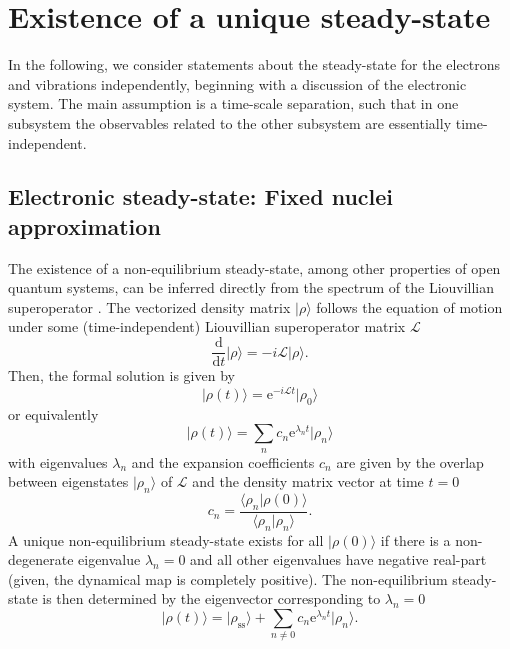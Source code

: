 \documentclass{article}
\newcommand{\exP}[1]{\mathrm{e}^{#1}}
\newcommand{\dif}{\mathrm{d}}
\begin{document}
\section{Existence of a unique steady-state}
In the following, we consider statements about the steady-state for the electrons and vibrations independently, beginning with a discussion of the electronic system. The main assumption is a time-scale separation, such that in one subsystem the observables related to the other subsystem are essentially time-independent. 
\subsection{Electronic steady-state: Fixed nuclei approximation} 
 
The existence of a non-equilibrium steady-state, among other properties of open quantum systems, can be inferred directly from the spectrum of the Liouvillian superoperator \cite{rivas2012open}. 
The vectorized density matrix $\vert\rho\rangle$ follows the equation of motion under some (time-independent) Liouvillian superoperator matrix $\mathcal{L}$
\begin{equation}
	\frac{\dif}{\dif t}\vert\rho\rangle = -i\mathcal{L}\vert\rho\rangle.
\end{equation}
Then, the formal solution is given by
\begin{equation}
	\vert\rho(t)\rangle = \exP{-i\mathcal{L}t}\vert\rho_0\rangle
\end{equation}
or equivalently 
\begin{equation}
	\vert\rho(t)\rangle = \sum_n c_n\exP{\lambda_n t}\vert \rho_n\rangle
\end{equation}
with eigenvalues $\lambda_n$ and the expansion coefficients $c_n$ are given by the overlap between eigenstates $\vert\rho_n\rangle$ of $\mathcal{L}$ and the density matrix vector at time $t=0$
\begin{equation}
	c_n = \frac{\langle \rho_n \vert \rho(0)\rangle}{\langle \rho_n\vert \rho_n\rangle}.
\end{equation}
A unique non-equilibrium steady-state exists for all $\vert\rho(0)\rangle$ if there is a non-degenerate eigenvalue $\lambda_n = 0$ and  all other eigenvalues have negative real-part (given, the dynamical map is completely positive). The non-equilibrium steady-state is then determined by the eigenvector corresponding to $\lambda_n = 0$
\begin{equation}
	\vert\rho(t)\rangle = \vert\rho_\mathrm{ss}\rangle + \sum_{n\neq 0} c_n\exP{\lambda_n t}\vert\rho_n\rangle.
\end{equation}
\end{document}
